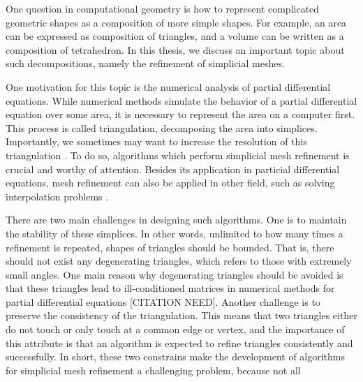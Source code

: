 One question in computational geometry is how to represent complicated geometric shapes as a composition of more simple shapes. For example, an area can be expressed as composition of triangles, and a volume can be written as a composition of tetrahedron. In this thesis, we discuss an important topic about such decompositions, namely the refinement of simplicial meshes.

One motivation for this topic is the numerical analysis of partial differential equations. While numerical methods simulate the behavior of a partial differential equation over some area, it is necessary  to represent the area on a computer first. This process is called triangulation, decomposing the area into simplices. Importantly, we sometimes may want to increase the resolution of this triangulation \cite{grosso1998hierarchical}. To do so, algorithms which perform simplicial mesh refinement is crucial and worthy of attention. Besides its application in particial differential equations, mesh refinement can also be applied in other field, such as solving interpolation problems \cite{moore1992simplical}.

There are two main challenges in designing such algorithms. One is to maintain the stability of these simplices. In other words, unlimited to how many times a refinement is repeated, shapes of triangles should be bounded. That is, there should not exist any degenerating triangles, which refers to those with extremely small angles. One main reason why degenerating triangles should be avoided is that these triangles lead to ill-conditioned matrices in numerical methods for partial differential equations [CITATION NEED]. Another challenge is to  preserve the consistency of the triangulation. This means that two triangles either do not touch or only touch at a common edge or vertex, and the importance of this attribute is that an algorithm is expected to refine triangles consistently and successfully. In short, these two constrains make the development of algorithms for simplicial mesh refinement a challenging problem, because not all  

